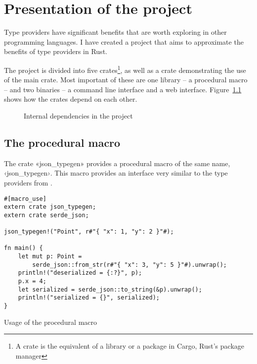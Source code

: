 
\chapter{Presentation of the project}

Type providers have significant benefits that are worth exploring in other programming languages. I have created a project that aims to approximate the benefits of type providers in Rust.

The project is divided into five crates\footnote{A crate is the equivalent of a library or a package in Cargo, Rust's package manager}, as well as a crate demonstrating the use of the main crate. Most important of these are one library -- a procedural macro -- and two binaries -- a command line interface and a web interface. Figure~\ref{fig:crates} shows how the crates depend on each other.

\begin{figure}[ht!]
\centering
{}
\caption{Internal dependencies in the project}
\label{fig:crates}
\end{figure}

\section{The procedural macro}

The crate «json_typegen» provides a procedural macro of the same name, ‹json_typegen›. This macro provides an interface very similar to the type providers from \fsharpdata.

\begin{listing}[ht!]
\begin{verbatim}
#[macro_use]
extern crate json_typegen;
extern crate serde_json;

json_typegen!("Point", r#"{ "x": 1, "y": 2 }"#);

fn main() {
    let mut p: Point =
        serde_json::from_str(r#"{ "x": 3, "y": 5 }"#).unwrap();
    println!("deserialized = {:?}", p);
    p.x = 4;
    let serialized = serde_json::to_string(&p).unwrap();
    println!("serialized = {}", serialized);
}
\end{verbatim}
\caption{Usage of the procedural macro}
\label{lst:typegenmacro}
\end{listing}

